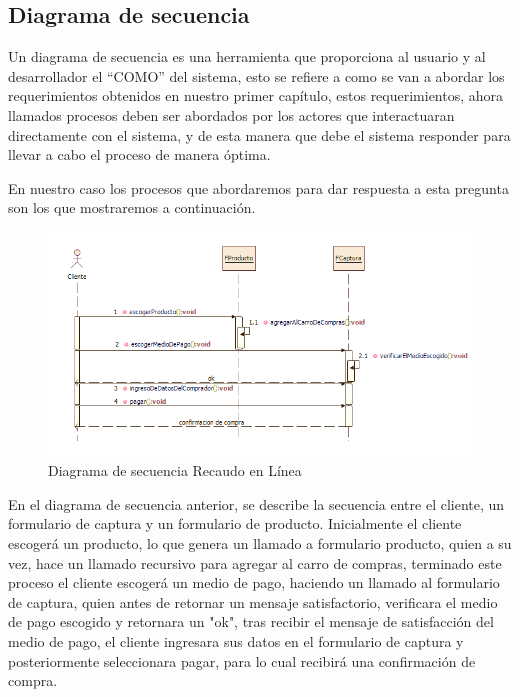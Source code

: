 \subsection{Diagrama de secuencia}

Un diagrama de secuencia es una herramienta que proporciona al usuario y al desarrollador el “COMO” del sistema, esto se refiere a como se van a abordar los requerimientos obtenidos en nuestro primer capítulo, estos requerimientos, ahora llamados procesos deben ser abordados por los actores que interactuaran directamente con el sistema, y de esta manera  que debe el sistema responder para llevar a cabo el proceso de manera óptima.

En nuestro caso los procesos que abordaremos para dar respuesta a esta pregunta son los que mostraremos a continuación.

\begin{figure}[th!]
	\centering
	\includegraphics[width=1.0\linewidth]{arquitectura/imagenes/DiagramaDeSequenciaRE}
	\caption{Diagrama de secuencia Recaudo en Línea}
\end{figure}

En el diagrama de secuencia anterior, se describe la secuencia entre el cliente, un formulario de captura y un formulario de producto. Inicialmente el cliente escogerá un producto, lo que genera un llamado a formulario producto, quien a su vez, hace un llamado recursivo para agregar al carro de compras, terminado este proceso el cliente escogerá un medio de pago, haciendo un llamado al formulario de captura, quien antes de retornar un mensaje satisfactorio, verificara el medio de pago escogido y retornara un "ok", tras recibir el mensaje de satisfacción del medio de pago, el cliente ingresara sus datos en el formulario de captura y posteriormente seleccionara pagar, para lo cual recibirá una confirmación de compra.


